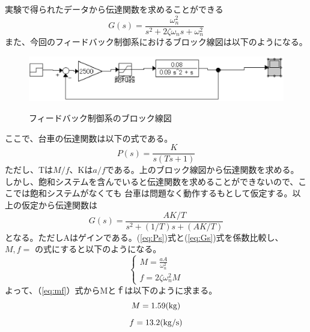 		実験で得られたデータから伝達関数を求めることができる
		\begin{equation}
			G(s) = \frac{\omega_{n}^{2}}{s^{2}+2\zeta\omega_{n}s + \omega_{n}^{2}}
		\end{equation}
		また、今回のフィードバック制御系におけるブロック線図は以下のようになる。
		\begin{figure}[H]
			\centering
			\includegraphics[width=1.0\linewidth]{gazo/FeedBackCart.eps}\\
			\caption{フィードバック制御系のブロック線図}
		\end{figure}
		ここで、台車の伝達関数は以下の式である。
		\begin{equation}
			P(s)=\frac{K}{s(Ts+1)}
			\label{eq:Ps}
		\end{equation}
		ただし、Tは$M/f$、Kは$a/f$である。上のブロック線図から伝達関数を求める。
		しかし、飽和システムを含んでいると伝達関数を求めることができないので、ここでは飽和システムがなくても
		台車は問題なく動作するもとして仮定する。以上の仮定から伝達関数は
		\begin{equation}
			G(s) = \frac{AK/T}{s^{2}+(1/T)s+(AK/T)}
			\label{eq:Gs}
		\end{equation}
		となる。ただしAはゲインである。(\ref{eq:Ps})式と(\ref{eq:Gs})式を係数比較し、$M,f=$
		の式にすると以下のようになる。
		\begin{equation}
			\left\{
			\begin{array}{l}
				M=\frac{aA}{\omega_{n}^{2}} \\
				f=2\zeta\omega_{n}^{2}M
			\end{array}
			\right.
			\label{eq:mf}
		\end{equation}
		よって、（\ref{eq:mf}）式からMとｆは以下のように求まる。
		\[
			M=1.59(\rm{kg})
		\]
		\[
			f=13.2(\rm{kg/s})
		\]
		
